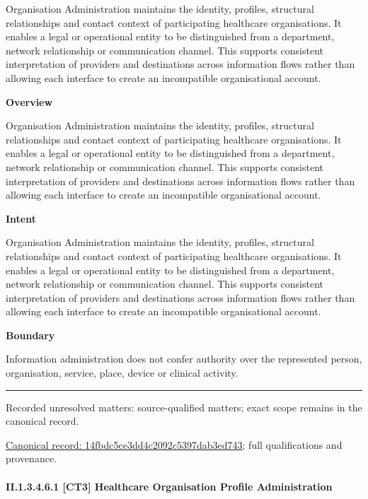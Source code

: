 Organisation Administration maintains the identity, profiles, structural relationships and contact context of participating healthcare organisations. It enables a legal or operational entity to be distinguished from a department, network relationship or communication channel. This supports consistent interpretation of providers and destinations across information flows rather than allowing each interface to create an incompatible organisational account.



\textbf{Overview}



Organisation Administration maintains the identity, profiles, structural relationships and contact context of participating healthcare organisations. It enables a legal or operational entity to be distinguished from a department, network relationship or communication channel. This supports consistent interpretation of providers and destinations across information flows rather than allowing each interface to create an incompatible organisational account.



\textbf{Intent}



Organisation Administration maintains the identity, profiles, structural relationships and contact context of participating healthcare organisations. It enables a legal or operational entity to be distinguished from a department, network relationship or communication channel. This supports consistent interpretation of providers and destinations across information flows rather than allowing each interface to create an incompatible organisational account.



\textbf{Boundary}



Information administration does not confer authority over the represented person, organisation, service, place, device or clinical activity.



\medskip\hrule\medskip

{\small Recorded unresolved matters: source-qualified matters; exact scope remains in the canonical record.}\par
{\footnotesize \href{../../../../continuum/strategy/capability/14fbdc5ce3dd4c2092c5397dab3ed743.md}{Canonical record: 14fbdc5ce3dd4c2092c5397dab3ed743}; full qualifications and provenance.}\par
\paragraph*{II.1.3.4.6.1 [CT3] Healthcare Organisation Profile Administration}
\label{navigation:II.1.3.4.6.1}

